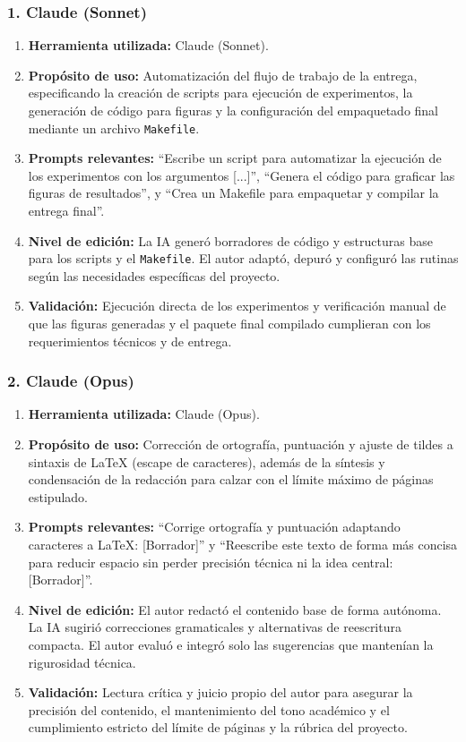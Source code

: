 \documentclass[letter, 10pt]{article}
\begin{document}
\subsubsection*{1. Claude (Sonnet)}
\begin{enumerate}
\item \textbf{Herramienta utilizada:} Claude (Sonnet).
\item \textbf{Prop\'osito de uso:} Automatizaci\'on del flujo de trabajo de la entrega, especificando la creaci\'on de scripts para ejecuci\'on de experimentos, la generaci\'on de c\'odigo para figuras y la configuraci\'on del empaquetado final mediante un archivo \texttt{Makefile}.
\item \textbf{Prompts relevantes:} ``Escribe un script para automatizar la ejecuci\'on de los experimentos con los argumentos [...]'', ``Genera el c\'odigo para graficar las figuras de resultados'', y ``Crea un Makefile para empaquetar y compilar la entrega final''.
\item \textbf{Nivel de edici\'on:} La IA gener\'o borradores de c\'odigo y estructuras base para los scripts y el \texttt{Makefile}. El autor adapt\'o, depur\'o y configur\'o las rutinas seg\'un las necesidades espec\'ificas del proyecto.
\item \textbf{Validaci\'on:} Ejecuci\'on directa de los experimentos y verificaci\'on manual de que las figuras generadas y el paquete final compilado cumplieran con los requerimientos t\'ecnicos y de entrega.
\end{enumerate}

\subsubsection*{2. Claude (Opus)}
\begin{enumerate}
\item \textbf{Herramienta utilizada:} Claude (Opus).
\item \textbf{Prop\'osito de uso:} Correcci\'on de ortograf\'ia, puntuaci\'on y ajuste de tildes a sintaxis de \LaTeX{} (escape de caracteres), adem\'as de la s\'intesis y condensaci\'on de la redacci\'on para calzar con el l\'imite m\'aximo de p\'aginas estipulado.
\item \textbf{Prompts relevantes:} ``Corrige ortograf\'ia y puntuaci\'on adaptando caracteres a \LaTeX{}: [Borrador]'' y ``Reescribe este texto de forma m\'as concisa para reducir espacio sin perder precisi\'on t\'ecnica ni la idea central: [Borrador]''.
\item \textbf{Nivel de edici\'on:} El autor redact\'o el contenido base de forma aut\'onoma. La IA sugiri\'o correcciones gramaticales y alternativas de reescritura compacta. El autor evalu\'o e integr\'o solo las sugerencias que manten\'ian la rigurosidad t\'ecnica.
\item \textbf{Validaci\'on:} Lectura cr\'itica y juicio propio del autor para asegurar la precisi\'on del contenido, el mantenimiento del tono acad\'emico y el cumplimiento estricto del l\'imite de p\'aginas y la r\'ubrica del proyecto.
\end{enumerate}




\end{document}
